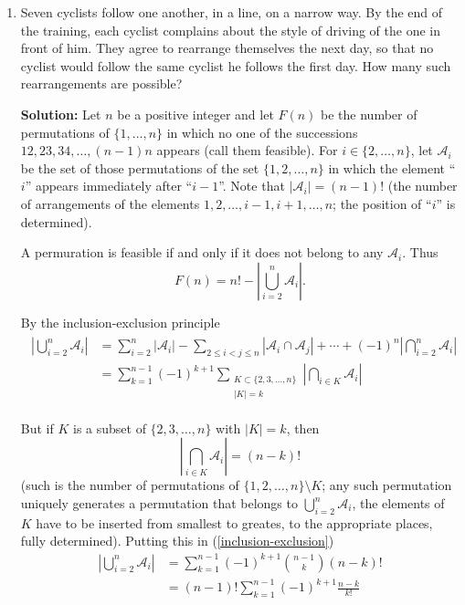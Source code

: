 \documentclass{article}
\newcommand{\solution}[1]{%
\ifsolutions%
    \textbf{Solution: } #1
\fi
}
\begin{document}
\begin{enumerate}
{\begin{enumerate}[1.]
\end{enumerate}
}

\item Seven cyclists follow one another, in a line, on a narrow way. By the end of the training, each cyclist complains about the style of driving of the one in front of him. They agree to rearrange themselves the next day, so that no cyclist would follow the same cyclist he follows the first day. How many such rearrangements are possible?

\solution{%
    Let $n$ be a positive integer and let $F(n)$ be the number of permutations of $\{ 1, \dots, n \}$ in which no one of the successions $12, 23, 34, \dots, (n-1)n$ appears (call them feasible). For $i \in \{2, \dots, n \}$, let $\mathcal{A}_i$ be the set of those permutations of the set $\{ 1, 2, \dots, n \}$ in which the element ``$i$'' appears immediately after ``$i - 1$''. Note that $|\mathcal{A}_i| = (n - 1)!$ (the number of arrangements of the elements $1, 2, \dots, i-1, i+1, \dots, n$; the position of ``$i$'' is determined).

A permuration is feasible if and only if it does not belong to any $\mathcal{A}_i$. Thus
\[
    F(n) = n! - \left| \bigcup_{i = 2}^{n} \mathcal{A}_i \right|.
\]

By the inclusion-exclusion principle
\begin{align} \label{inclusion-exclusion}
\begin{split}
    \left| \bigcup_{i = 2}^{n} \mathcal{A}_i \right| & = \sum_{i = 2}^{n} |\mathcal{A}_i| - \sum_{2 \leq i < j \leq n} |\mathcal{A}_i \cap \mathcal{A}_j | + \cdots + {(-1)}^n \left| \bigcap_{i = 2}^{n} \mathcal{A}_i \right| \\
    & = \sum_{k = 1}^{n - 1} {(-1)}^{k + 1} \sum_{\substack{K \subset \{2, 3, \dots, n \} \\ |K| = k}} \left| \bigcap_{i \in K} \mathcal{A}_i \right|
\end{split}
\end{align}

But if $K$ is a subset of $\{2, 3, \dots, n\}$ with $|K| = k$, then
\[
    \left| \bigcap_{i \in K} \mathcal{A}_i \right| = (n - k)!
\]
(such is the number of permutations of $\{1, 2, \dots, n\} \setminus K$; any such permutation uniquely generates a permutation that belongs to $\bigcup_{i = 2}^{n} \mathcal{A}_i$, the elements of $K$ have to be inserted from smallest to greates, to the appropriate places, fully determined). Putting this in (\ref{inclusion-exclusion})
\begin{align*}
    \left| \bigcup_{i = 2}^n \mathcal{A}_i \right| & = \sum_{k = 1}^{n - 1} {(-1)}^{k + 1} \binom{n-1}{k} (n - k)! \\
    & = (n - 1)! \sum_{k = 1}^{n-1} {(-1)}^{k + 1} \frac{n-k}{k!}
\end{align*}

}
\end{enumerate}
\end{document}
